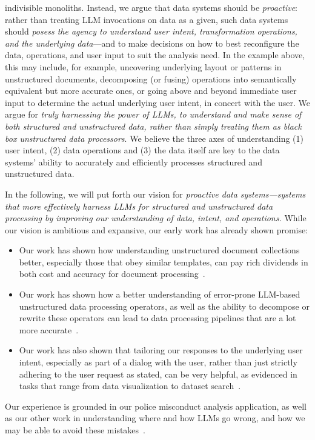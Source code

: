 indivisible monoliths.
Instead, we argue that data systems should be {\em proactive}:
rather than treating LLM invocations on data as a given, 
such data systems should {\em posess 
the agency to understand user intent, transformation operations, 
and the underlying data}---and to make decisions
on how to best reconfigure the data, operations, and user
input to suit the analysis need.
In the example above, this may include,
for example, 
uncovering underlying layout or patterns 
in unstructured documents,
decomposing (or fusing) operations into semantically
equivalent but more accurate ones,
or going above and beyond immediate user input
to determine the actual underlying user intent,
in concert with the user. 
We argue for {\em truly harnessing the power of LLMs,
to understand and make sense of 
both structured and unstructured data,
rather than simply treating them as black box unstructured data processors}.
We believe the three axes of understanding (1) user intent, (2) data operations 
and (3) the data 
itself are key to the data systems' 
ability to accurately and efficiently processes structured and unstructured data. 

In the following, we will put forth our
vision for {\em proactive data systems---systems
that more effectively harness LLMs for structured and unstructured data
processing by improving our understanding
of data, intent, and operations.}
While our vision is ambitious and expansive,
our early work has already shown promise:
\begin{itemize}
    \item
Our work has shown how
understanding unstructured document collections better, especially
those that obey similar templates, can pay
rich dividends in both cost and accuracy for
document processing~\cite{lin2025twix,lin2024towards}.
\item
Our work 
has shown how a better understanding of error-prone
LLM-based unstructured data processing operators,
as well as the ability to decompose or rewrite
these operators can lead to data processing
pipelines that are a lot more accurate~\cite{shankar2024docetl,parameswaran2023revisiting}.
\item
Our work has also shown
that tailoring our responses
to the underlying user intent,
especially as part of a dialog with the user, 
rather than just strictly adhering to the user
request as stated,
can be very helpful, as evidenced in tasks
that range from data visualization
to dataset search~\cite{zeighami2024nudge,li2024inferring,hulsebos2024took}.
\end{itemize}
Our experience is grounded in our police
misconduct analysis
application, as well as our other work
in understanding where
and how LLMs go wrong, and how we may
be able to avoid these mistakes~\cite{shankar2024spade,shankar2024validates}.


